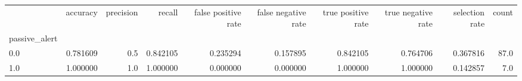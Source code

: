 \begin{tabular}{lrrrrrrrrr}
\toprule
{} &  accuracy &  precision &    recall &  false positive rate &  false negative rate &  true positive rate &  true negative rate &  selection rate &  count \\
passive\_alert &           &            &           &                      &                      &                     &                     &                 &        \\
\midrule
0.0           &  0.781609 &        0.5 &  0.842105 &             0.235294 &             0.157895 &            0.842105 &            0.764706 &        0.367816 &   87.0 \\
1.0           &  1.000000 &        1.0 &  1.000000 &             0.000000 &             0.000000 &            1.000000 &            1.000000 &        0.142857 &    7.0 \\
\bottomrule
\end{tabular}
